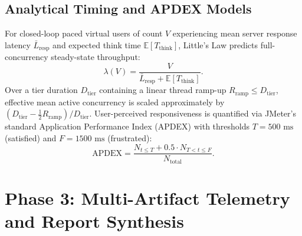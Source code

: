 \documentclass[11pt,letterpaper]{article}
\begin{document}
\subsection{Analytical Timing and APDEX Models}
For closed-loop paced virtual users of count $V$ experiencing mean server response latency $\bar{L}_{\text{resp}}$ and expected think time $\mathbb{E}[T_{\text{think}}]$, Little's Law predicts full-concurrency steady-state throughput:
\begin{equation}
  \label{eq:little}
  \lambda(V) = \frac{V}{\bar{L}_{\text{resp}} + \mathbb{E}[T_{\text{think}}]}.
\end{equation}
Over a tier duration $D_{\text{tier}}$ containing a linear thread ramp-up $R_{\text{ramp}} \le D_{\text{tier}}$, effective mean active concurrency is scaled approximately by $(D_{\text{tier}} - \tfrac{1}{2} R_{\text{ramp}}) / D_{\text{tier}}$. User-perceived responsiveness is quantified via JMeter's standard Application Performance Index (APDEX) with thresholds $T = 500\text{ ms}$ (satisfied) and $F = 1500\text{ ms}$ (frustrated):
\begin{equation}
  \label{eq:apdex}
  \text{APDEX} = \frac{N_{t \le T} + 0.5 \cdot N_{T < t \le F}}{N_{\text{total}}}.
\end{equation}

\section{Phase 3: Multi-Artifact Telemetry and Report Synthesis}
\end{document}
